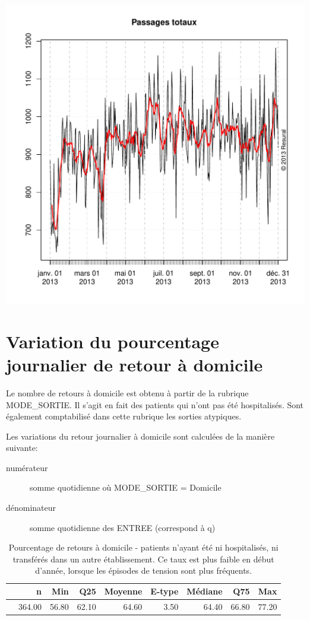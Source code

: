\documentclass[12pt,english,french,twoside]{book}\usepackage[]{graphicx}\usepackage[]{color}
\makeatletter
\def\maxwidth{ %
  \ifdim\Gin@nat@width>\linewidth
    \linewidth
  \else
    \Gin@nat@width
  \fi
}
\makeatother
\begin{document}
\includegraphics[width=\maxwidth]{figure/passages_totaux3} 




\section{Variation du pourcentage journalier de retour à domicile}

Le nombre de retours à domicile est obtenu à partir de la rubrique MODE\_SORTIE. Il s'agit en fait des patients qui n'ont pas été hospitalisés. Sont également comptabilisé dans cette rubrique les sorties atypiques.

Les variations du retour journalier à domicile sont calculées de la manière suivante:
\begin{description}
  \item[numérateur] somme quotidienne où MODE\_SORTIE = Domicile
  \item[dénominateur] somme quotidienne des ENTREE (correspond à q)
\end{description}

\begin{table}[ht]
\centering
\begin{tabular}{rrrrrrrrr}
  \hline
 & n & Min & Q25 & Moyenne & E-type & Médiane & Q75 & Max \\ 
  \hline
 & 364.00 & 56.80 & 62.10 & 64.60 & 3.50 & 64.40 & 66.80 & 77.20 \\ 
   \hline
\end{tabular}
\caption[Retour à domicile]{Pourcentage de retours à domicile - patients n'ayant été ni hospitalisés, ni transférés dans un autre établissement. Ce taux est plus faible en début d'année, lorsque les épisodes de tension sont plus fréquents.} 
\label{tab:rd}
\end{table}
\end{document}
